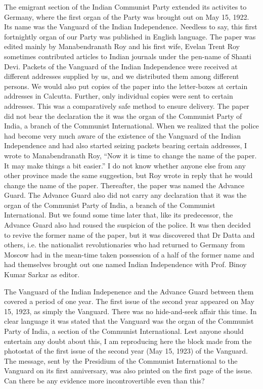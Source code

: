 The emigrant section of the Indian Communist Party extended its activites to Germany, where the first organ of the Party was brought out on May 15, 1922. Its name was the Vanguard of the Indian Independence. Needless to say, this first fortnightly organ of our Party was published in English language. The paper was edited mainly by Manabendranath Roy and his first wife, Evelan Trent Roy sometimes contributed articles to Indian journals under the pen-name of Shanti Devi. Packets of the Vanguard of the Indian Independence were received at different addresses supplied by us, and we distributed them among different persons. We would also put copies of the paper into the letter-boxes at certain addresses in Calcutta. Further, only individual copies were sent to certain addresses. This was a comparatively safe method to ensure delivery. The paper did not bear the declaration the it was the organ of the Communist Party of India, a branch of the Communist International. When we realized that the police had become very much aware of the existence of the Vanguard of the Indian Independence and had also started seizing packets bearing certain addresses, I wrote to Manabendranath Roy, “Now it is time to change the name of the paper. It may make things a bit easier.” I do not know whether anyone else from any other province made the same suggestion, but Roy wrote in reply that he would change the name of the paper. Thereafter, the paper was named the Advance Guard. The Advance Guard also did not carry any declaration that it was the organ of the Communist Party of India, a branch of the Communist International. But we found some time later that, like its predecessor, the Advance Guard also had roused the suspicion of the police. It was then decided to revive the former name of the paper, but it was discovered that Dr Datta and others, i.e. the nationalist revolutionaries who had returned to Germany from Moscow had in the mean-time taken possession of a half of the former name and had themselves brought out one named Indian Independence with Prof. Binoy Kumar Sarkar as editor. 

The Vanguard of the Indian Indepenence and the Advance Guard between them covered a period of one year. The first issue of the second year appeared on May 15, 1923, as simply the Vanguard. There was no hide-and-seek affair this time. In clear language it was stated that the Vanguard was the organ of the Communist Party of India, a section of the Communist International. Lest anyone should entertain any doubt about 
this, I am reproducing here the block made from the photostat of the first issue of the second year (May 15, 1923) of the Vanguard. The message, sent by the Presidium of the Communist International to the Vanguard on its first anniversary, was also printed on the first page of the issue. Can there be any evidence more incontrovertible even than this? 

